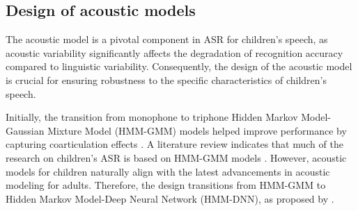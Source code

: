 
\subsection{Design of acoustic models}%
The acoustic model is a pivotal component in ASR for children's speech, as acoustic variability significantly affects the degradation of recognition accuracy compared to linguistic variability. Consequently, the design of the acoustic model is crucial for ensuring robustness to the specific characteristics of children's speech.

Initially, the transition from monophone to triphone Hidden Markov Model-Gaussian Mixture Model (HMM-GMM) models helped improve performance by capturing coarticulation effects \cite{potamianos1997automatic,language_children2}. A literature review \cite{bhardwaj2022automatic} indicates that much of the research on children's ASR is based on HMM-GMM models \cite{bhardwaj2022automatic}. However, acoustic models for children naturally align with the latest advancements in acoustic modeling for adults. Therefore, the design transitions from HMM-GMM to Hidden Markov Model-Deep Neural Network (HMM-DNN), as proposed by \cite{TFchildren}.


